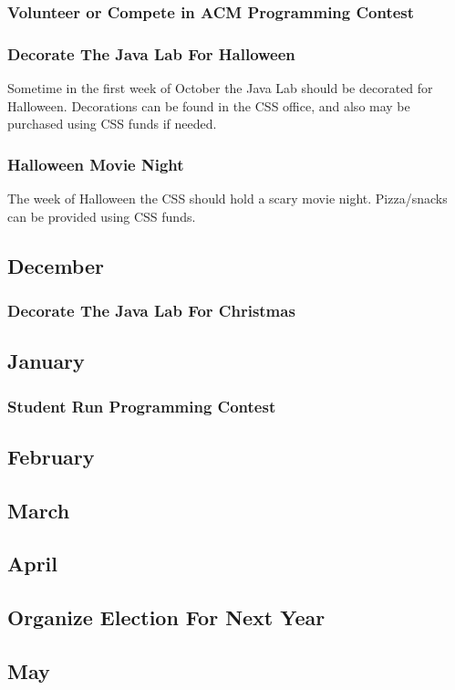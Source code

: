 \documentclass[12pt]{article}
\begin{document}
\subsubsection{Volunteer or Compete in ACM Programming Contest}

\subsubsection{Decorate The Java Lab For Halloween}
Sometime in the first week of October the Java Lab should be decorated
for Halloween. Decorations can be found in the CSS office, and also may be
purchased using CSS funds if needed.

\subsubsection{Halloween Movie Night}
The week of Halloween the CSS should hold a scary movie night.  Pizza/snacks
can be provided using CSS funds.

\subsection{December}

\subsubsection{Decorate The Java Lab For Christmas}

\subsection{January}

\subsubsection{Student Run Programming Contest}

\subsection{February}
\subsection{March}
\subsection{April}

\subsection{Organize Election For Next Year}

\subsection{May}
\end{document}
